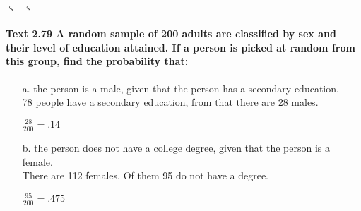 \documentclass{article}
\begin{document}
\begin{center}
$\upvarsigma$\_$\upvarsigma$
\end{center}

\pagebreak

\paragraph{Text 2.79 A random sample of 200 adults are classified by sex and
their level of education attained. If a person is picked at random from this group,
find the probability that:\\}
\begin{enumerate}
\item[a.] the person is a male, given that the person has a secondary education.\\
78 people have a secondary education, from that there are 28 males.
\begin{center}
$\boxed{\frac{28}{200} = .14}$
\end{center}

\item[b.] the person does not have a college degree, given that the person is a female.\\
There are 112 females. Of them 95 do not have a degree.
\begin{center}
$\boxed{\frac{95}{200} = .475}$
\end{center}
\end{enumerate}
\end{document}
